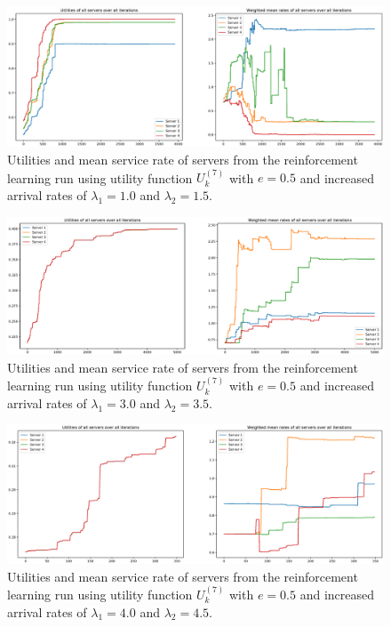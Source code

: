 \begin{figure}[H]
    \includegraphics[width=\textwidth]{chapters/00_appendix/03_more_rl_results/Bin/utility_7_eps/u7_6_e05_Lambda_25.eps}
    \caption{Utilities and mean service rate of servers from the reinforcement
    learning run using utility function \(U_k^{(7)}\) with \(e = 0.5\) and
    increased arrival rates of \(\lambda_1 = 1.0\) and \(\lambda_2 = 1.5\).}
    \label{fig:RL_utility7_6_e05_Lambda_25}
\end{figure}


\begin{figure}[H]
    \includegraphics[width=\textwidth]{chapters/00_appendix/03_more_rl_results/Bin/utility_7_eps/u7_6_e05_Lambda_65.eps}
    \caption{Utilities and mean service rate of servers from the reinforcement
    learning run using utility function \(U_k^{(7)}\) with \(e = 0.5\) and
    increased arrival rates of \(\lambda_1 = 3.0\) and \(\lambda_2 = 3.5\).}
    \label{fig:RL_utility7_6_e05_Lambda_65}
\end{figure}


\begin{figure}[H]
    \includegraphics[width=\textwidth]{chapters/00_appendix/03_more_rl_results/Bin/utility_7_eps/u7_6_e05_Lambda_85.eps}
    \caption{Utilities and mean service rate of servers from the reinforcement
    learning run using utility function \(U_k^{(7)}\) with \(e = 0.5\) and
    increased arrival rates of \(\lambda_1 = 4.0\) and \(\lambda_2 = 4.5\).}
    \label{fig:RL_utility7_6_e05_Lambda_85}
\end{figure}